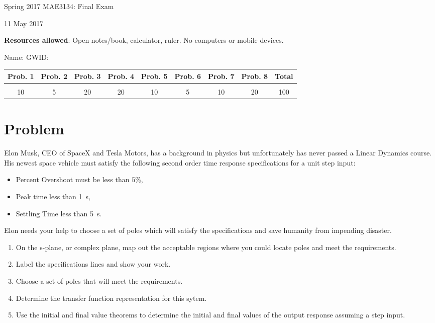 \documentclass[titlepage, 11pt, reqno]{article}    %
\begin{document}
\begin{titlepage}
    \centering
    \vspace{1cm}
    {\Large Spring 2017 MAE3134: Final Exam\par }
    \vspace{3cm}
    {11 May 2017\par}
    \vspace{1cm}
    \textbf{Resources allowed}: Open notes/book, calculator, ruler. 
    No computers or mobile devices.

    \vspace{1cm}
    {Name: \underline{\hspace{5cm}} \hspace{2cm} GWID:\underline{\hspace{5cm}}\par}
    \vspace{3cm}

    \begin{tabular}{|c|c|c|c|c|c|c|c|c|}
        \hline
        Prob. 1 & Prob. 2 & Prob. 3 & Prob. 4 & Prob. 5 & Prob. 6 & Prob. 7 & Prob. 8 & Total \\
        \hline
         & & & & & & & &\\[4ex]
        \hline
        10 & 5 & 20 & 20 & 10 & 5 & 10 & 20 & 100 \\[4ex]
        \hline
    \end{tabular}
    \vfill
\end{titlepage}

\section{Problem}\label{prob:sys_response_to_poles}
Elon Musk, CEO of SpaceX and Tesla Motors, has a background in physics but unfortunately has never passed a Linear Dynamics course. 
His newest space vehicle must satisfy the following second order time response specifications for a unit step input:
\begin{itemize}
    \item Percent Overshoot must be less than \(5 \%\),
    \item Peak time less than \SI{1}{\second},
    \item Settling Time less than \SI{5}{\second}.
\end{itemize}
Elon needs your help to choose a set of poles which will satisfy the specifications and save humanity from impending disaster.
\begin{enumerate}
    \item On the s-plane, or complex plane, map out the acceptable regions where you could locate poles and meet the requirements. 
    \item Label the specifications lines and show your work.
    \item Choose a set of poles that will meet the requirements.
    \item Determine the transfer function representation for this sytem.
    \item Use the initial and final value theorems to determine the initial and final values of the output response assuming a step input.
\end{enumerate}
\end{document}
